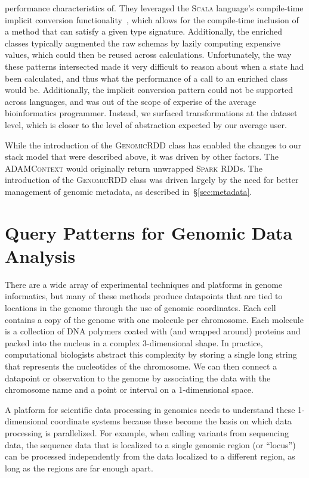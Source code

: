 \documentclass[phd]{ucbthesis}
\begin{document}
\begin{itemize}
  performance characteristics of. They leveraged the \textsc{Scala} language's
  compile-time implicit conversion functionality~\cite{odersky04}, which allows for
  the compile-time inclusion of a method that can satisfy a given type
  signature. Additionally, the enriched classes typically augmented the raw
  schemas by lazily computing expensive values, which could then be reused
  across calculations. Unfortunately, the way these patterns intersected made it
  very difficult to reason about when a state had been calculated, and thus what
  the performance of a call to an enriched class would be. Additionally, the
  implicit conversion pattern could not be supported across languages, and was
  out of the scope of experise of the average bioinformatics programmer.
  Instead, we surfaced transformations at the dataset level, which is closer to
  the level of abstraction expected by our average user.
\end{itemize}

While the introduction of the \textsc{GenomicRDD} class has enabled the changes
to our stack model that were described above, it was driven by other factors.
The \textsc{ADAMContext} would originally return unwrapped \textsc{Spark} RDDs.
The introduction of the \textsc{GenomicRDD} class was driven largely by the need
for better management of genomic metadata, as described in~\S\ref{sec:metadata}.

\section{Query Patterns for Genomic Data Analysis}
\label{sec:query-patterns}

There are a wide array of experimental techniques and platforms in genome informatics, but many of these
methods produce datapoints that are tied to locations in the genome through the use of genomic coordinates.
Each cell contains a copy of the genome with one molecule per chromosome. Each molecule is a collection of
DNA polymers coated with (and wrapped around) proteins and packed into the nucleus in a complex
3-dimensional shape. In practice, computational biologists abstract this complexity by storing a single long
string that represents the nucleotides of the chromosome. We can then connect a datapoint or observation to the
genome by associating the data with the chromosome name and a point or interval on a 1-dimensional space.

A platform for scientific data processing in genomics needs to understand these 1-dimensional coordinate
systems because these become the basis on which data processing is parallelized. For example, when calling
variants from sequencing data, the sequence data that is localized to a single genomic region (or ``locus'') can be 
processed independently from the data localized to a different region, as long as the regions are far enough
apart.
\end{document}
